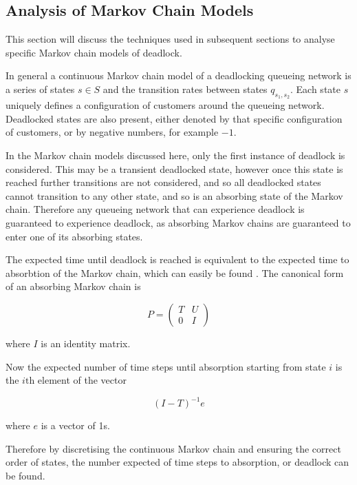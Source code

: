 \documentclass{article}
\begin{document}
\subsection{Analysis of Markov Chain Models}\label{sec:analysisMC}

This section will discuss the techniques used in subsequent sections to analyse specific Markov chain models of deadlock.

In general a continuous Markov chain model of a deadlocking queueing network is a series of states $s \in S$ and the transition rates between states $q_{s_1,s_2}$.
Each state $s$ uniquely defines a configuration of customers around the queueing network.
Deadlocked states are also present, either denoted by that specific configuration of customers, or by negative numbers, for example $-1$.

In the Markov chain models discussed here, only the first instance of deadlock is considered.
This may be a transient deadlocked state, however once this state is reached further transitions are not considered, and so all deadlocked states cannot transition to any other state, and so is an absorbing state of the Markov chain.
Therefore any queueing network that can experience deadlock is guaranteed to experience deadlock, as absorbing Markov chains are guaranteed to enter one of its absorbing states.

The expected time until deadlock is reached is equivalent to the expected time to absorbtion of the Markov chain, which can easily be found \cite{stewart09}.
The canonical form of an absorbing Markov chain is

\begin{equation*}
P = \left(\begin{matrix} T & U\\ 0 & I \end{matrix} \right)
\end{equation*}

where $I$ is an identity matrix.

Now the expected number of time steps until absorption starting from state $i$ is the $i\text{th}$ element of the vector

\begin{equation}
  (I - T)^{-1}e
\end{equation}

where $e$ is a vector of 1s.

Therefore by discretising the continuous Markov chain and ensuring the correct order of states, the number expected of time steps to absorption, or deadlock can be found.
\end{document}
